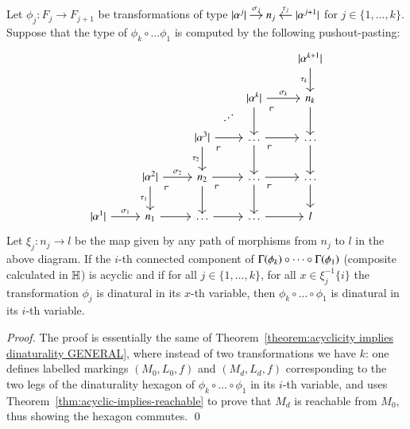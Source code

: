 \begin{theorem}\label{theorem:compositionality with complicated graphs}
    Let $\phi_j \colon F_j \to F_{j+1}$ be transformations of type 
    $
    \begin{tikzcd}[cramped,sep=small]
    \length{\alpha^j} \ar[r,"\sigma_j"] & n_j & \ar[l,"\tau_j"'] \length{\alpha^{j+1}}
    \end{tikzcd}
    $
    for $j \in \{1,\dots,k\}$.
    Suppose that the type of $\phi_k \circ \dots \phi_1$ is computed by the following pushout-pasting:
    \[
    \begin{tikzcd}
        &   &   &   & \length{\alpha^{k+1}} \ar[d,"\tau_k"'] \\
        &   &   & \length{\alpha^k} \ar[r,"\sigma_k"] \ar[d] \ar[dr, phantom, "\ulcorner" very near start] & n_k \ar[d] \\
        &   & \length{\alpha^3} \ar[r] \ar[ur,sloped,phantom,"\dots"] \ar[d,"\tau_2"'] \ar[dr, phantom, "\ulcorner" very near start] & \dots \ar[r] \ar[d] \ar[dr, phantom, "\ulcorner" very near start] & \dots \ar[d] \\
        & \length{\alpha^2} \ar[r,"\sigma_2"] \ar[d,"\tau_1"'] \ar[dr, phantom, "\ulcorner" very near start] & n_2 \ar[r] \ar[d] \ar[dr, phantom, "\ulcorner" very near start] & \dots \ar[r] \ar[d] \ar[dr, phantom, "\ulcorner" very near start] & \dots \ar[d] \\
        \length{\alpha^1} \ar[r,"\sigma_1"] & n_1 \ar[r] & \dots \ar[r] & \dots \ar[r] & l
    \end{tikzcd}
    \]
    Let $\xi_j \colon n_j \to l$ be the map given by any path of morphisms from $n_j$ to $l$ in the above diagram. If the $i$-th connected component of $\graph{\phi_k} \circ \dots \circ \graph{\phi_1}$ (composite calculated in $\mathbb H$) is acyclic and if for all $j \in  \{1,\dots,k\}$, for all $x \in \xi_j^{-1} \{i\}$ the transformation $\phi_j$ is dinatural in its $x$-th variable, then $\phi_k \circ \dots \circ \phi_1$ is dinatural in its $i$-th variable.
\end{theorem}
\begin{proof}
    The proof is essentially the same of Theorem~\ref{theorem:acyclicity implies dinaturality GENERAL}, where instead of two transformations we have $k$: one defines labelled markings $(M_0, L_0,f)$ and $(M_d,L_d,f)$ corresponding to the two legs of the dinaturality hexagon of $\phi_k \circ \dots \circ \phi_1$ in its $i$-th variable, and uses Theorem~\ref{thm:acyclic-implies-reachable} to prove that $M_d$ is reachable from $M_0$, thus showing the hexagon commutes. \qed
\end{proof}




